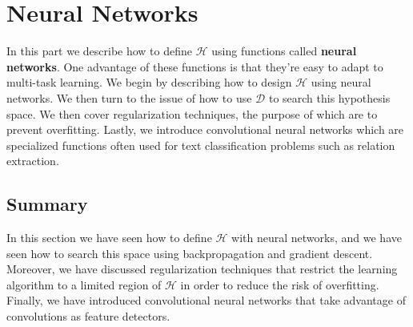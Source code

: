 \chapter{Neural Networks}
\label{neural_networks}

In this part we describe how to define $\mathcal{H}$ using functions called \textbf{neural networks}. One advantage of these functions is that they're easy to adapt to multi-task learning. We begin by describing how to design $\mathcal{H}$ using neural networks. We then turn to the issue of how to use $\mathcal{D}$ to search this hypothesis space. We then cover regularization techniques, the purpose of which are to prevent overfitting. Lastly, we introduce convolutional neural networks which are specialized functions often used for text classification problems such as relation extraction.





\section{Summary}
In this section we have seen how to define $\mathcal{H}$ with neural networks, and we have seen how to search this space using backpropagation and gradient descent. Moreover, we have discussed regularization techniques that restrict the learning algorithm to a limited region of $\mathcal{H}$ in order to reduce the risk of overfitting. Finally, we have introduced convolutional neural networks that take advantage of convolutions as feature detectors.
